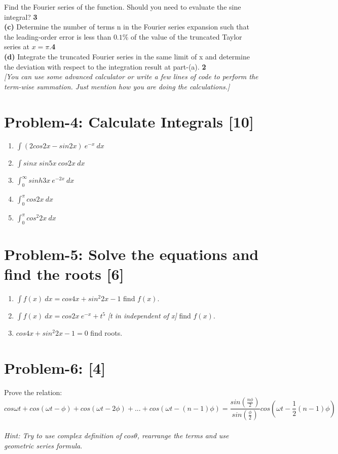 \documentclass[12pt, a4paper]{article}
\begin{document}
Find the Fourier series of the function. Should you need to evaluate the sine integral? \hfill\textbf{3}\\
\textbf{(c)} Determine the number of terms n in the Fourier series expansion such that the leading-order
error is less than $0.1\%$ of the value of the truncated Taylor series at $x=\pi$.\hfill\textbf{4}\\
\textbf{(d)} Integrate the truncated Fourier series in the same limit of x and determine the
deviation with respect to the integration result at part-(a). \hfill\textbf{2}\\
\textit{[You can use some advanced calculator or write a few lines of code to perform the term-wise summation. 
Just mention how you are doing the calculations.]}

\section*{Problem-4: Calculate Integrals \hfill \textbf{[10]}}
\begin{enumerate}
    \item $\int (2cos2x - sin2x)\ e^{-x}\ dx$
    \item $\int sinx\ sin5x\ cos2x\ dx$
    \item $\int_{0}^{\infty}sinh3x\ e^{-2x}\ dx$
    \item $\int_{0}^{\pi}cos2x\ dx$
    \item $\int_{0}^{\pi}cos^{2}2x\ dx$
\end{enumerate}

\section*{Problem-5: Solve the equations and find the roots \hfill \textbf{[6]}}
\begin{enumerate}
    \item $\int f(x)\ dx = cos4x + sin^{2}2x -1$ find $f(x)$.
    \item $\int f(x)\ dx = cos2x\ e^{-x} + t^5$ \textit{[t in independent of x]} find $f(x)$.
    \item $cos4x + sin^{2}2x-1 = 0$ find roots.
\end{enumerate}
\section*{Problem-6:  \hfill \textbf{[4]}}
Prove the relation:
\begin{equation*}
    cos\omega t  + cos(\omega t- \phi) + cos(\omega t- 2\phi) +...+ cos(\omega t- (n-1)\phi) = 
    \frac{sin(\frac{n\phi}{2})}{sin(\frac{\phi}{2})}cos(\omega t -\frac{1}{2}(n-1)\phi)
\end{equation*}\\
\textit{Hint: Try to use complex definition of $cos\theta$, rearrange the terms and use geometric series formula}.
\end{document}
